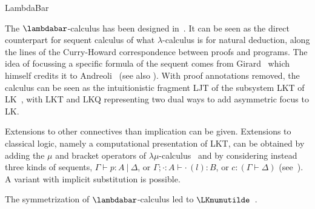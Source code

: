 \begin{entry}{LambdaBar}
\begin{history}
The $\lambdabar$-calculus has been designed
in~\cite{Herbelin94,HerbelinPhD}. It can be seen as the direct counterpart
for sequent calculus of what $\lambda$-calculus is for natural
deduction, along the lines of the Curry-Howard correspondence between
proofs and programs. The idea of focussing a specific formula of the
sequent comes from Girard~\cite{girard91mscs} which himself credits it to
Andreoli~\cite{andreoli92jlc} (see also ). With proof
annotations removed, the calculus can be seen as the intuitionistic
fragment LJT of the subsystem LKT of LK~\cite{danos93wll}, with LKT and
LKQ representing two dual ways to add asymmetric focus to LK.

Extensions to other connectives than implication can be given.
Extensions to classical logic, namely a computational presentation of
LKT, can be obtained by adding the $\mu$ and bracket operators of
$\lambda\mu$-calculus~ and by considering instead three
kinds of sequents, $\Gamma \vdash p:A ~|~ \Delta$, or
$\Gamma; \cdot:A \vdash \cdot\,(l):B$, or $c: (\Gamma \vdash \Delta)$
(see~\cite{HerbelinPhD}). A variant with implicit substitution is
possible.

The symmetrization of $\lambdabar$-calculus led to
$\LKmumutilde$~.
\end{history}











\end{entry}
